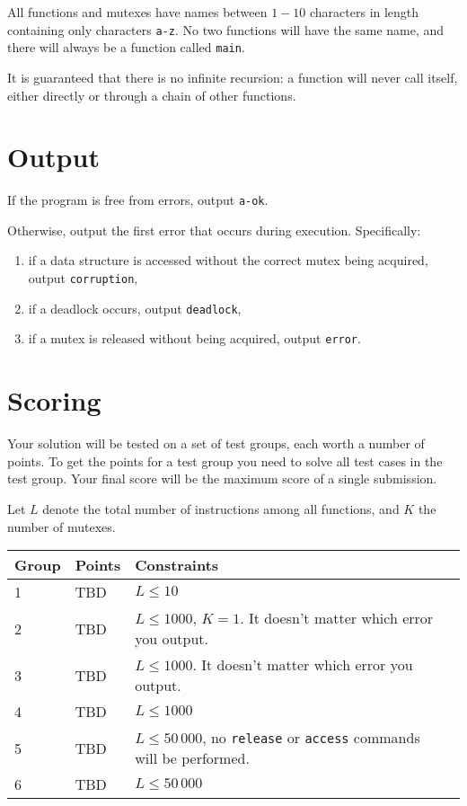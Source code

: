 All functions and mutexes have names between $1-10$ characters in length containing only characters \texttt{a-z}.
No two functions will have the same name, and there will always be a function called \texttt{main}.

It is guaranteed that there is no infinite recursion: a function will never call itself, either directly or through a chain of other functions.

\section*{Output}
If the program is free from errors, output \texttt{a-ok}.

Otherwise, output the first error that occurs during execution. Specifically:
\begin{enumerate}
  \item if a data structure is accessed without the correct mutex being acquired, output \texttt{corruption},
  \item if a deadlock occurs, output \texttt{deadlock},
  \item if a mutex is released without being acquired, output \texttt{error}.
\end{enumerate}

\section*{Scoring}
Your solution will be tested on a set of test groups, each worth a number of points.
To get the points for a test group you need to solve all test cases in the test group.
Your final score will be the maximum score of a single submission.

Let $L$ denote the total number of instructions among all functions, and $K$ the number of mutexes.

\noindent
\begin{tabular}{| l | l | l | l |}
\hline
Group & Points & Constraints \\ \hline
1     & TBD    & $L \le 10$ \\ \hline
2     & TBD    & $L \le 1000$, $K = 1$. It doesn't matter which error you output. \\ \hline
3     & TBD    & $L \le 1000$. It doesn't matter which error you output. \\ \hline
4     & TBD    & $L \le 1000$ \\ \hline
5     & TBD    & $L \le 50\,000$, no \texttt{release} or \texttt{access} commands will be performed. \\ \hline
6     & TBD    & $L \le 50\,000$ \\ \hline
\end{tabular}

